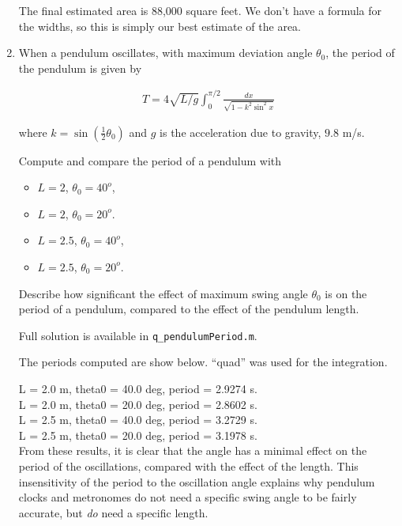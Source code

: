 \begin{enumerate}[1.]
\begin{Solution}
The final estimated area is 88,000 square feet.  We don't have a
formula for the widths, so this is simply our best estimate of the
area.

\end{Solution}


\item 
  \begin{Question}
    
When a pendulum oscillates, with maximum deviation angle
  $\theta_0$, the period of the pendulum is given by

\begin{align*}
  T = 4 \sqrt{L/g} \int_0^{\pi/2} \frac{dx}{\sqrt{1 - k^2 \sin^2 x}}
\end{align*}

where $k = \sin\left(\frac{1}{2} \theta_0\right)$ and $g$ is the
acceleration due to gravity, $9.8 $ m/s.

Compute and compare the period of a pendulum with 
\begin{itemize}
\item $L = 2$, $\theta_0 = 40^o$, 
\item $L =2$, $\theta_0 = 20^o$.
\item $L = 2.5$, $\theta_0 = 40^o$, 
\item $L =2.5$, $\theta_0 = 20^o$.
\end{itemize}

Describe how significant the effect of maximum swing angle $\theta_0$
is on the period of a pendulum, compared to the effect of the pendulum
length.
  \end{Question}

\begin{Solution} 
 Full solution is available in \verb#q_pendulumPeriod.m#.

  The periods computed are show below.  ``quad'' was used for the
  integration.

L = 2.0 m, theta0 = 40.0 deg, period = 2.9274 s. \\
L = 2.0 m, theta0 = 20.0 deg, period = 2.8602 s. \\
L = 2.5 m, theta0 = 40.0 deg, period = 3.2729 s. \\
L = 2.5 m, theta0 = 20.0 deg, period = 3.1978 s. \\

From these results, it is clear that the angle has a minimal effect on
the period of the oscillations, compared with the effect of the
length.  This insensitivity of the period to the oscillation angle
explains why pendulum clocks and metronomes do not need a specific
swing angle to be fairly accurate, but {\em do} need a specific
length.
\end{Solution} 



\end{enumerate}
